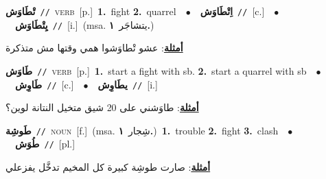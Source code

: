 \documentclass[10pt,a4paper,twoside]{article} %
\begin{document}
\begin{multicols}{2}
{\setlength\topsep{0pt}\textbf{\foreignlanguage{arabic}{تْطَاوَش}}\ {\color{gray}\texttt{//}\color{black}}\ \textsc{verb}\ [p.]\ \textbf{1.}~fight  \textbf{2.}~quarrel\ \ $\bullet$\ \ \setlength\topsep{0pt}\textbf{\foreignlanguage{arabic}{اِتْطَاوَش}}\ {\color{gray}\texttt{//}\color{black}}\ [c.]\ \ $\bullet$\ \ \setlength\topsep{0pt}\textbf{\foreignlanguage{arabic}{يِتْطَاوَش}}\ {\color{gray}\texttt{//}\color{black}}\ [i.]\ \color{gray}(msa. \foreignlanguage{arabic}{يتشاجَر}~\foreignlanguage{arabic}{\textbf{١.}})\color{black}\  \begin{flushright}\color{gray}\foreignlanguage{arabic}{\textbf{\underline{\foreignlanguage{arabic}{أمثلة}}}: عشو تْطاوَشوا همي وقتها مش متذكرة}\end{flushright}\color{black}} \vspace{2mm}

{\setlength\topsep{0pt}\textbf{\foreignlanguage{arabic}{طَاوَش}}\ {\color{gray}\texttt{//}\color{black}}\ \textsc{verb}\ [p.]\ \textbf{1.}~start a fight with sb.  \textbf{2.}~start a quarrel with sb\ \ $\bullet$\ \ \setlength\topsep{0pt}\textbf{\foreignlanguage{arabic}{طَاوِش}}\ {\color{gray}\texttt{//}\color{black}}\ [c.]\ \ $\bullet$\ \ \setlength\topsep{0pt}\textbf{\foreignlanguage{arabic}{يطَاوِش}}\ {\color{gray}\texttt{//}\color{black}}\ [i.]\  \begin{flushright}\color{gray}\foreignlanguage{arabic}{\textbf{\underline{\foreignlanguage{arabic}{أمثلة}}}: طاوَشني على 20 شيق متخيل النتانة لوين؟}\end{flushright}\color{black}} \vspace{2mm}

{\setlength\topsep{0pt}\textbf{\foreignlanguage{arabic}{طَوشِة}}\ {\color{gray}\texttt{//}\color{black}}\ \textsc{noun}\ [f.]\ \color{gray}(msa. \foreignlanguage{arabic}{شِجار}~\foreignlanguage{arabic}{\textbf{١.}})\color{black}\ \textbf{1.}~trouble  \textbf{2.}~fight  \textbf{3.}~clash\ \ $\bullet$\ \ \setlength\topsep{0pt}\textbf{\foreignlanguage{arabic}{طُوَش}}\ {\color{gray}\texttt{//}\color{black}}\ [pl.]\  \begin{flushright}\color{gray}\foreignlanguage{arabic}{\textbf{\underline{\foreignlanguage{arabic}{أمثلة}}}: صارت طوشِة كبيرة كل المخيم تدخَّل يفزعلي}\end{flushright}\color{black}} \vspace{2mm}


\end{multicols}
\end{document}
